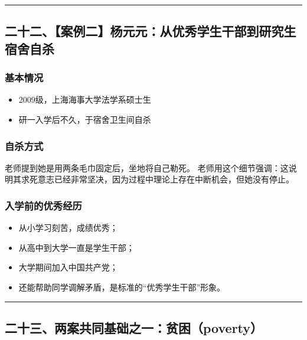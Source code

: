 \documentclass[
  chinese,
  9pt,
  a4paper,
]{ctexart}
\providecommand{\tightlist}{%
  \setlength{\itemsep}{0pt}\setlength{\parskip}{0pt}}
\begin{document}
\begin{center}\rule{0.5\linewidth}{0.5pt}\end{center}

\subsection{二十二、【案例二】杨元元：从优秀学生干部到研究生宿舍自杀}\label{ux4e8cux5341ux4e8cux6848ux4f8bux4e8cux6768ux5143ux5143ux4eceux4f18ux79c0ux5b66ux751fux5e72ux90e8ux5230ux7814ux7a76ux751fux5bbfux820dux81eaux6740}

\subsubsection{基本情况}\label{ux57faux672cux60c5ux51b5-1}

\begin{itemize}
\tightlist
\item
  2009级，上海海事大学法学系硕士生
\item
  研一入学后不久，于宿舍卫生间自杀
\end{itemize}

\subsubsection{自杀方式}\label{ux81eaux6740ux65b9ux5f0f-1}

老师提到她是用两条毛巾固定后，坐地将自己勒死。
老师用这个细节强调：这说明其求死意志已经非常坚决，因为过程中理论上存在中断机会，但她没有停止。

\subsubsection{入学前的优秀经历}\label{ux5165ux5b66ux524dux7684ux4f18ux79c0ux7ecfux5386}

\begin{itemize}
\tightlist
\item
  从小学习刻苦，成绩优秀；
\item
  从高中到大学一直是学生干部；
\item
  大学期间加入中国共产党；
\item
  还能帮助同学调解矛盾，是标准的``优秀学生干部''形象。
\end{itemize}

\begin{center}\rule{0.5\linewidth}{0.5pt}\end{center}

\subsection{二十三、两案共同基础之一：贫困（poverty）}\label{ux4e8cux5341ux4e09ux4e24ux6848ux5171ux540cux57faux7840ux4e4bux4e00ux8d2bux56f0poverty}
\end{document}
